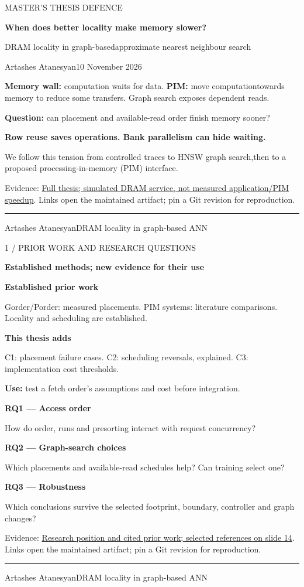 \documentclass[11pt]{article}
\newenvironment{slide}[2]{%
  \clearpage\color{ink}\fontsize{14}{18}\selectfont
  {\fontsize{10}{12}\selectfont\color{accent}\MakeUppercase{#1}\par}
  {\fontsize{25}{29}\selectfont\bfseries #2\par}\vspace{4pt}
}{%
  \vfill{\color{accent}\hrule}\vspace{4pt}
  {\fontsize{9}{11}\selectfont\color{muted}Artashes Atanesyan\hfill DRAM locality in graph-based ANN\hfill\thepage\par}
}
\newcommand{\takeaway}[1]{\par\vspace{3pt}\colorbox{wash}{\parbox{\dimexpr\linewidth-2\fboxsep\relax}{\strut\textbf{#1}\strut}}\par}
\newcommand{\evidence}[2]{\vfill{\fontsize{9}{11}\selectfont\color{muted}Evidence: \href{https://github.com/senqx/Thesis-PIM-ANN/blob/main/#1}{#2}. Links open the maintained artifact; pin a Git revision for reproduction.\par}}
\begin{document}

\begin{slide}{Master's thesis defence}{When does better locality make memory slower?}
\vspace{6pt}
{\fontsize{20}{25}\selectfont DRAM locality in graph-based\newline approximate nearest neighbour search\par}
\vspace{10pt}
Artashes Atanesyan\hfill 10 November 2026

\textbf{Memory wall:} computation waits for data. \textbf{PIM:} move computation\newline towards memory to reduce some transfers. Graph search exposes dependent reads.

\textbf{Question:} can placement and available-read order finish memory sooner?

\takeaway{Row reuse saves operations. Bank parallelism can hide waiting.}
We follow this tension from controlled traces to HNSW graph search,\newline then to a proposed processing-in-memory (PIM) interface.
\evidence{doc/pim_ann_thesis.pdf}{Full thesis; simulated DRAM service, not measured application/PIM speedup}
\end{slide}

\begin{slide}{1 / Prior work and research questions}{Established methods; new evidence for their use}
\begin{minipage}[t]{0.47\linewidth}
\textbf{Established prior work}\par
Gorder/Porder: measured placements.\newline
PIM systems: literature comparisons.\newline
Locality and scheduling are established.
\par\textbf{This thesis adds}\par
C1: placement failure cases.\newline
C2: scheduling reversals, explained.\newline
C3: implementation cost thresholds.\par
\textbf{Use:} test a fetch order's assumptions and cost before integration.
\end{minipage}\hfill
\begin{minipage}[t]{0.49\linewidth}
\textbf{RQ1 --- Access order}\par
How do order, runs and presorting interact with request concurrency?
\par\textbf{RQ2 --- Graph-search choices}\par
Which placements and available-read schedules help? Can training select one?
\par\textbf{RQ3 --- Robustness}\par
Which conclusions survive the selected footprint, boundary, controller and graph changes?
\end{minipage}

\evidence{doc/RESEARCH_POSITION.md}{Research position and cited prior work; selected references on slide 14}
\end{slide}
\end{document}
